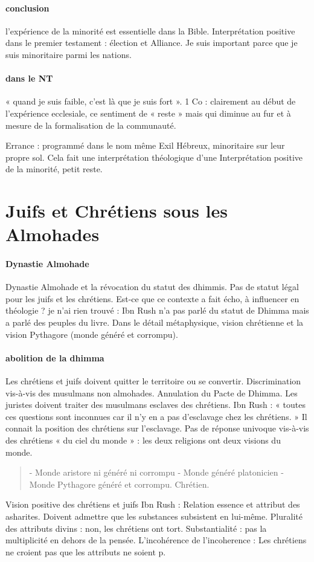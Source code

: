 \paragraph{conclusion} l’expérience de la minorité est essentielle dans la Bible. Interprétation positive dans le premier testament : élection et Alliance. Je suis important parce que je suis minoritaire parmi les nations.

\paragraph{dans le NT} « quand je suis faible, c’est là que je suis fort ». 1 Co : clairement au début de l’expérience ecclesiale, ce sentiment de « reste » mais qui diminue au fur et à mesure de la formalisation de la communauté.
 

\begin{Synthesis}
Errance : programmé dans le nom même
Exil
Hébreux, minoritaire sur leur propre sol.
Cela fait une interprétation théologique d’une Interprétation positive de la minorité, petit reste.
\end{Synthesis}
\section{Juifs et Chrétiens sous les Almohades}
\paragraph{Dynastie Almohade}
Dynastie Almohade et la révocation du statut des dhimmis. Pas de statut légal pour les juifs et les chrétiens.  Est-ce que ce contexte a fait écho, à influencer en théologie ? je n’ai rien trouvé : Ibn Rush n’a pas parlé du statut de Dhimma mais a parlé des peuples du livre. Dans le détail métaphysique, vision chrétienne et la vision Pythagore (monde généré et corrompu). 
\paragraph{abolition de la dhimma}
Les chrétiens et juifs doivent quitter le territoire ou se convertir. Discrimination vis-à-vis des musulmans non almohades.
Annulation du Pacte de Dhimma.
Les juristes doivent traiter des musulmans esclaves des chrétiens. Ibn Rush :
« toutes ces questions sont inconnues car il n’y en a pas d’esclavage chez les chrétiens. »
Il connait la position des chrétiens sur l’esclavage.  
Pas de réponse univoque vis-à-vis des chrétiens
« du ciel du monde » : les deux religions ont deux visions du monde. 
\begin{quote}
-	Monde aristore ni généré ni corrompu
-	Monde généré platonicien
-	Monde Pythagore généré et corrompu. Chrétien. 
\end{quote}
Vision positive des chrétiens et juifs
Ibn Rush : 
Relation essence et attribut des asharites. Doivent admettre que les substances subsistent en lui-même. Pluralité des attributs divins : non, les chrétiens ont tort. 
Substantialité : pas la multiplicité en dehors de la pensée. 
L’incohérence de l’incoherence : 
Les chrétiens ne croient pas que les attributs ne soient p. 

